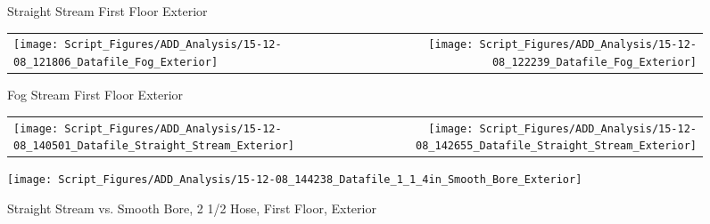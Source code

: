 \documentclass{article}
\begin{document}
\begin{figure}[ht]
\centering
{}
\caption{Straight Stream First Floor Exterior}
\label{fig:Straight Stream First Floor Exterior}
\end{figure}

\clearpage

\begin{figure}[ht]
\begin{tabular*}{\textwidth}{lr}
\texttt{[image: Script\_Figures/ADD\_Analysis/15-12-08\_121806\_Datafile\_Fog\_Exterior]} &
\texttt{[image: Script\_Figures/ADD\_Analysis/15-12-08\_122239\_Datafile\_Fog\_Exterior]} \\
\end{tabular*}
\caption{Fog Stream First Floor Exterior}
\label{fig:Fog Stream First Floor Exterior}
\end{figure}

\clearpage

\begin{figure}[ht]
\begin{tabular*}{\textwidth}{lr}
\texttt{[image: Script\_Figures/ADD\_Analysis/15-12-08\_140501\_Datafile\_Straight\_Stream\_Exterior]} &
\texttt{[image: Script\_Figures/ADD\_Analysis/15-12-08\_142655\_Datafile\_Straight\_Stream\_Exterior]} \\
\end{tabular*}
\centering
\texttt{[image: Script\_Figures/ADD\_Analysis/15-12-08\_144238\_Datafile\_1\_1\_4in\_Smooth\_Bore\_Exterior]}
\caption{Straight Stream vs. Smooth Bore, 2 1/2 Hose, First Floor, Exterior}
\label{fig:Straight Stream vs. Smooth Bore, 2 1/2 Hose, First Floor Exterior}
\end{figure}
\end{document}
